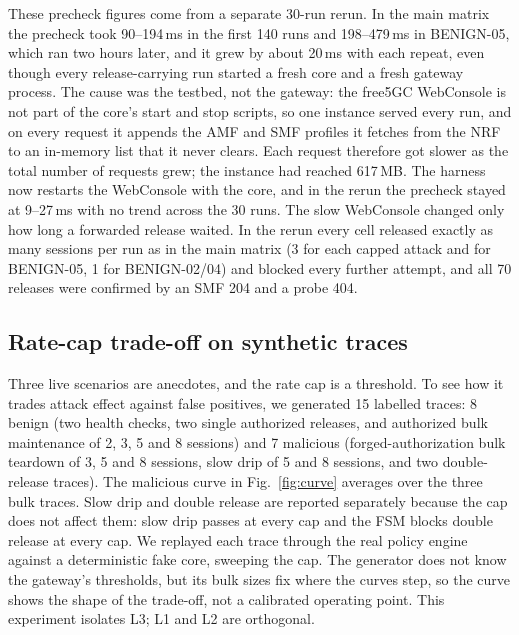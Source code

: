 \documentclass[conference]{IEEEtran}
\begin{document}
These precheck figures come from a separate 30-run rerun. In the main matrix the precheck took
90--194\,ms in the first 140 runs and 198--479\,ms in BENIGN-05, which ran two hours later, and it
grew by about 20\,ms with each repeat, even though every release-carrying run
started a fresh core and a fresh gateway process. The cause was the testbed, not the gateway: the
free5GC WebConsole is not part of the core's start and stop scripts, so one instance served every
run, and on every request it appends the AMF and SMF profiles it fetches from the NRF to an
in-memory list that it never clears. Each request therefore got slower as the total number of
requests grew; the instance had reached 617\,MB. The harness now restarts the WebConsole with the
core, and in the rerun the precheck stayed at 9--27\,ms with no trend across the 30 runs. The slow
WebConsole changed only how long a forwarded release waited. In the rerun every cell released
exactly as many sessions per run as in the main matrix (3 for each capped attack and for BENIGN-05,
1 for BENIGN-02/04) and blocked every further attempt, and all 70 releases were confirmed by an SMF
204 and a probe 404.

\subsection{Rate-cap trade-off on synthetic traces}

Three live scenarios are anecdotes, and the rate cap is a threshold. To see how it trades
attack effect against false positives, we generated 15 labelled traces: 8 benign (two health
checks, two single authorized releases, and authorized bulk maintenance of 2, 3, 5 and 8
sessions) and 7 malicious (forged-authorization bulk teardown of 3, 5 and 8 sessions, slow
drip of 5 and 8 sessions, and two double-release traces). The malicious curve in
Fig.~\ref{fig:curve} averages over the three bulk traces. Slow drip and double release are
reported separately because the cap does not affect them: slow drip passes at every cap and the
FSM blocks double release at every cap. We replayed each trace through the real
policy engine against a deterministic fake core, sweeping the cap. The generator does not
know the gateway's thresholds, but its bulk sizes fix where the curves step, so the curve shows
the shape of the trade-off, not a calibrated operating point. This experiment isolates L3; L1 and
L2 are orthogonal.
\end{document}
